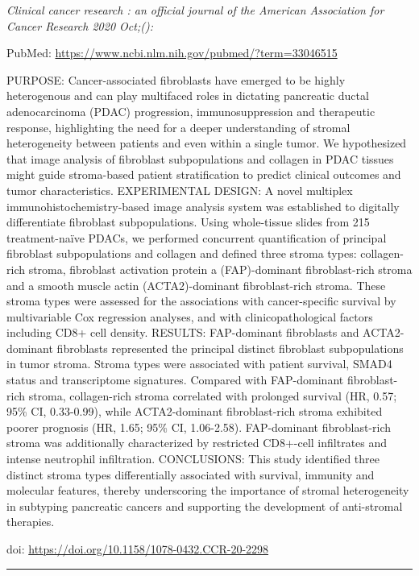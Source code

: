 \documentclass[
]{article}
\begin{document}
\emph{Clinical cancer research : an official journal of the American
Association for Cancer Research 2020 Oct;():}

PubMed: \url{https://www.ncbi.nlm.nih.gov/pubmed/?term=33046515}

PURPOSE: Cancer-associated fibroblasts have emerged to be highly
heterogenous and can play multifaced roles in dictating pancreatic
ductal adenocarcinoma (PDAC) progression, immunosuppression and
therapeutic response, highlighting the need for a deeper understanding
of stromal heterogeneity between patients and even within a single
tumor. We hypothesized that image analysis of fibroblast subpopulations
and collagen in PDAC tissues might guide stroma-based patient
stratification to predict clinical outcomes and tumor characteristics.
EXPERIMENTAL DESIGN: A novel multiplex immunohistochemistry-based image
analysis system was established to digitally differentiate fibroblast
subpopulations. Using whole-tissue slides from 215 treatment-naïve
PDACs, we performed concurrent quantification of principal fibroblast
subpopulations and collagen and defined three stroma types:
collagen-rich stroma, fibroblast activation protein a (FAP)-dominant
fibroblast-rich stroma and a smooth muscle actin (ACTA2)-dominant
fibroblast-rich stroma. These stroma types were assessed for the
associations with cancer-specific survival by multivariable Cox
regression analyses, and with clinicopathological factors including CD8+
cell density. RESULTS: FAP-dominant fibroblasts and ACTA2-dominant
fibroblasts represented the principal distinct fibroblast subpopulations
in tumor stroma. Stroma types were associated with patient survival,
SMAD4 status and transcriptome signatures. Compared with FAP-dominant
fibroblast-rich stroma, collagen-rich stroma correlated with prolonged
survival (HR, 0.57; 95\% CI, 0.33-0.99), while ACTA2-dominant
fibroblast-rich stroma exhibited poorer prognosis (HR, 1.65; 95\% CI,
1.06-2.58). FAP-dominant fibroblast-rich stroma was additionally
characterized by restricted CD8+-cell infiltrates and intense neutrophil
infiltration. CONCLUSIONS: This study identified three distinct stroma
types differentially associated with survival, immunity and molecular
features, thereby underscoring the importance of stromal heterogeneity
in subtyping pancreatic cancers and supporting the development of
anti-stromal therapies.

doi: \url{https://doi.org/10.1158/1078-0432.CCR-20-2298}

\begin{center}\rule{0.5\linewidth}{0.5pt}\end{center}
\end{document}
